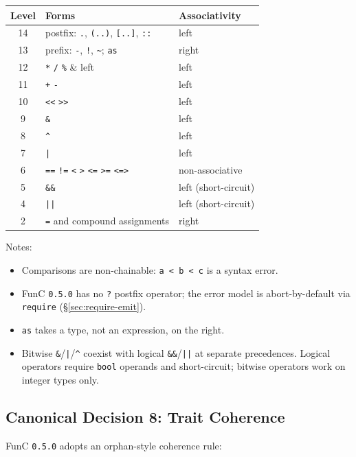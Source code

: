 \documentclass[12pt,oneside]{article}
\begin{document}
\begin{center}
\begin{tabular}{|c|l|l|}
\hline
\textbf{Level} & \textbf{Forms} & \textbf{Associativity} \\ \hline
14 & postfix: \verb|.|, \verb|(..)|, \verb|[..]|, \verb|::| & left \\ \hline
13 & prefix: \verb|-|, \verb|!|, \verb|~|; \verb|as| & right \\ \hline
12 & \verb|*|  \verb|/|  \verb|%| & left \\ \hline
11 & \verb|+|  \verb|-| & left \\ \hline
10 & \verb|<<|  \verb|>>| & left \\ \hline
 9 & \verb|&| & left \\ \hline
 8 & \verb|^| & left \\ \hline
 7 & \verb+|+ & left \\ \hline
 6 & \verb|==| \verb|!=| \verb|<| \verb|>| \verb|<=| \verb|>=| \verb|<=>| & non-associative \\ \hline
 5 & \verb|&&| & left (short-circuit) \\ \hline
 4 & \verb+||+ & left (short-circuit) \\ \hline
 2 & \verb|=| and compound assignments & right \\ \hline
\end{tabular}
\end{center}

Notes:

\begin{itemize}
\item Comparisons are non-chainable: \verb|a < b < c| is a syntax error.
\item FunC \verb|0.5.0| has no \verb|?| postfix operator; the error
model is abort-by-default via \verb|require| (\S\ref{sec:require-emit}).
\item \verb|as| takes a type, not an expression, on the right.
\item Bitwise \verb|&|/\verb+|+/\verb|^| coexist with logical
\verb|&&|/\verb+||+ at separate precedences. Logical operators require
\verb|bool| operands and short-circuit; bitwise operators work on
integer types only.
\end{itemize}

\subsection{Canonical Decision 8: Trait Coherence}
\label{sec:cd-coherence}
FunC \verb|0.5.0| adopts an orphan-style coherence rule:
\end{document}
